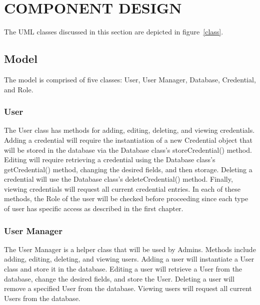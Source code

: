 \documentclass[letterpaper,12pt,oneside,listof=totoc]{scrreprt}
\begin{document}
\chapter{COMPONENT DESIGN}
The UML classes discussed in this section are depicted in figure~\ref{class}.

\section{Model}
The model is comprised of five classes: User, User Manager, Database, Credential, and Role. 

\subsection{User}
The User class has methods for adding, editing, deleting, and viewing credentials. Adding a credential will require the instantiation of a new Credential object that will be stored in the database via the Database class's storeCredential() method. Editing will require retrieving a credential using the Database class's getCredential() method, changing the desired fields, and then storage. Deleting a credential will use the Database class's deleteCredential() method. Finally, viewing credentials will request all current credential entries. In each of these methods, the Role of the user will be checked before proceeding since each type of user has specific access as described in the first chapter.

\subsection{User Manager}
The User Manager is a helper class that will be used by Admins. Methods include adding, editing, deleting, and viewing users. Adding a user will instantiate a User class and store it in the database. Editing a user will retrieve a User from the database, change the desired fields, and store the User. Deleting a user will remove a specified User from the database. Viewing users will request all current Users from the database. 
\end{document}
